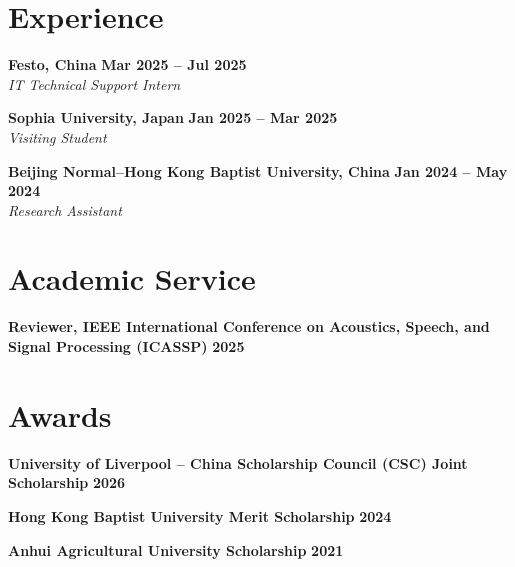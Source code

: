 \documentclass{resume}
\begin{document}
\section{Experience}
\begin{content}

    {\bf Festo, China} \hfill {\bf Mar 2025 -- Jul 2025} \\
    {\em IT Technical Support Intern}

    \vspace{0.25\baselineskip}

    {\bf Sophia University, Japan} \hfill {\bf Jan 2025 -- Mar 2025} \\
    {\em Visiting Student}

    \vspace{0.25\baselineskip}

    {\bf Beijing Normal--Hong Kong Baptist University, China}
    \hfill {\bf Jan 2024 -- May 2024} \\
    {\em Research Assistant}

\sectionlineskip
\end{content}

\section{Academic Service}
\begin{content}
    {\bf Reviewer, IEEE International Conference on Acoustics, Speech, and Signal Processing (ICASSP)} \hfill {\bf 2025}

\sectionlineskip
\end{content}

\section{Awards}
\begin{content}
    {\bf University of Liverpool -- China Scholarship Council (CSC) Joint Scholarship} \hfill {\bf 2026}

    {\bf Hong Kong Baptist University Merit Scholarship} \hfill {\bf 2024}

    {\bf Anhui Agricultural University Scholarship} \hfill {\bf 2021}%
\sectionlineskip
\end{content}

\end{document}

